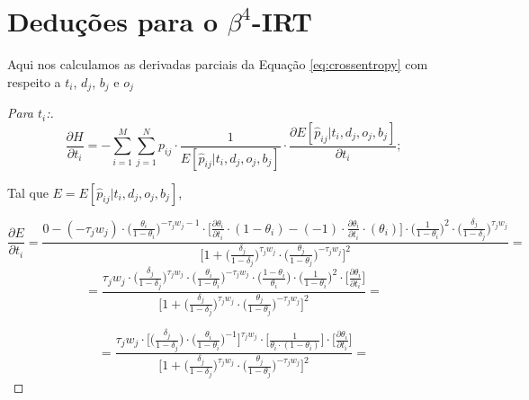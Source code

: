 \chapter{Deduções para o $\beta^4$-\gls{IRT}}
\label{ap:deducoes}

Aqui nos calculamos as derivadas parciais da Equação \ref{eq:crossentropy} com respeito a $t_i$, $d_j$, $b_j$ e $o_j$ 

\begin{proof}[Para $t_i$:]
    \begin{equation}
            \label{eq:ap1}
            \frac{\partial H}{\partial t_i} = -\sum_{i=1}^{M}\sum_{j=1}^{N} p_{ij}\cdot \frac{1}{E[\hat{p}_{ij} | t_i, d_j, o_j, b_j]} \cdot \frac{\partial E[\hat{p}_{ij} | t_i, d_j, o_j, b_j]}{\partial t_i};
    \end{equation}
        
    \noindent Tal que $E = E[\hat{p}_{ij} | t_i, d_j, o_j, b_j]$, 
    
        \begin{equation}
            \frac{\partial E}{\partial t_i} = \frac{0 - ( - \tau_j w_j)\cdot\big(\frac{\theta_i}{1 - \theta_i}\big)^{-\tau_j w_j - 1}\cdot \bigg[\frac{\partial \theta_i}{\partial t_i}\cdot (1 - \theta_i) - ( -1)\cdot \frac{\partial \theta_i}{\partial t_i}\cdot (\theta_i)\bigg]\cdot \big(\frac{1}{1 - \theta_i}\big)^{2}\cdot\big(\frac{\delta_j}{1 - \delta_j}\big)^{\tau_j w_j}}{
            \bigg[1 + \big(\frac{\delta_j}{1 - \delta_j}\big)^{\tau_j w_j}\cdot \big(\frac{\theta_j}{1 - \theta_j}\big)^{-\tau_j w_j}\bigg]^{2}
            } = 
        \end{equation}
        \begin{equation}
            = \frac{\tau_j w_j\cdot \big(\frac{\delta_j}{1 - \delta_j}\big)^{\tau_j w_j}\cdot \big(\frac{\theta_i}{1 - \theta_i}\big)^{-\tau_j w_j} \cdot \big(\frac{1 - \theta_i}{\theta_i}\big) \cdot \big(\frac{1}{1 - \theta_i}\big)^{2}\cdot \big[\frac{\partial \theta_i}{\partial t_i}\big]}{
            \bigg[1 + \big(\frac{\delta_j}{1 - \delta_j}\big)^{\tau_j w_j}\cdot \big(\frac{\theta_j}{1 - \theta_j}\big)^{-\tau_j w_j}\bigg]^{2}
            } = 
        \end{equation}
        
        \begin{equation}
        \label{eq:f1}
            = \frac{\tau_j w_j\cdot \bigg[\big(\frac{\delta_j}{1 - \delta_j}\big)\cdot \big(\frac{\theta_i}{1 - \theta_i}\big)^{-1}\bigg]^{\tau_j w_j}\cdot  \big[\frac{1}{\theta_i\cdot(1 - \theta_i)}\big]\cdot \big[\frac{\partial \theta_i}{\partial t_i}\big]}{
            \bigg[1 + \big(\frac{\delta_j}{1 - \delta_j}\big)^{\tau_j w_j}\cdot \big(\frac{\theta_j}{1 - \theta_j}\big)^{-\tau_j w_j}\bigg]^{2}
            } = 
        \end{equation}
    

\end{proof}
